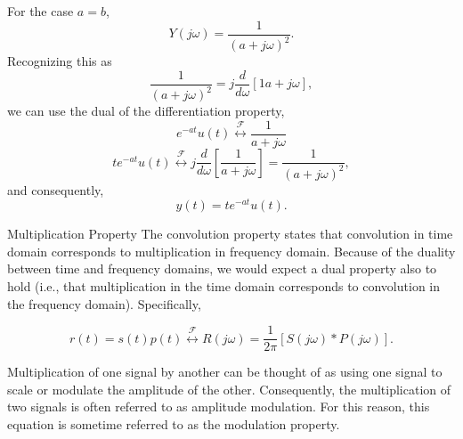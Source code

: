 \begin{frame}
    {
        For the case $a=b$,
        \begin{equation*}
            Y(j\omega) = \frac{1}{(a+j\omega)^2}.
        \end{equation*}   
        \pause
        Recognizing this as
        \begin{equation*}
            \frac{1}{(a+j\omega)^2} = j\frac{d}{d\omega}\left[{1}{a+j\omega}\right],
        \end{equation*}   
        we can use the dual of the differentiation property,
        \begin{equation*}
            e^{-at}u(t) \overset{\mathcal{F}}{\longleftrightarrow} \frac{1}{a+j\omega}
        \end{equation*}
        \begin{equation*}
            te^{-at}u(t) \overset{\mathcal{F}}{\longleftrightarrow} j\frac{d}{d\omega}\left[\frac{1}{a+j\omega}\right] = \frac{1}{(a+j\omega)^2},
        \end{equation*}    
        and consequently,
        \begin{equation*}
            y(t) = te^{-at}u(t).
        \end{equation*}    
    }
\end{frame}



\begin{frame}{Multiplication Property}
    The convolution property states that convolution in \alert{time} domain corresponds to multiplication in \alert{frequency} domain. Because of the duality between time and frequency domains, we would expect a dual property also to hold (i.e., that multiplication in the time domain corresponds to convolution in the frequency domain). Specifically,

    \begin{equation*}
        r(t) = s(t)p(t) \overset{\mathcal{F}}{\longleftrightarrow} R(j\omega) = \frac{1}{2\pi}[S(j\omega)\ast P(j\omega)].
    \end{equation*}

    Multiplication of one signal by another can be thought of as using one signal to scale or \alert{modulate} the amplitude of the other. Consequently, the multiplication of two signals is often referred to as \alert{amplitude modulation}. For this reason, this equation is sometime referred to as the \alert{modulation property}.
\end{frame}

